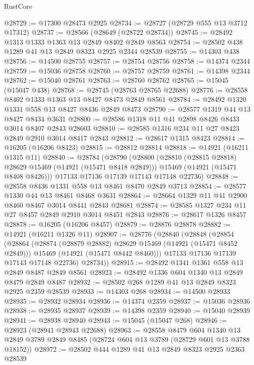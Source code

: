 \begin{lexlean}{RustCore}
\begin{coremodule}
@28729 := @17300 @28473 @2925
@28734 := @28727 (@28729 @555 @13 @3712 @17312)
@28737 := @28566 (@28649 (@28722 @28734))
@28745 := @28492 @1313 @1333 @1363 @13 @2849 @8402 @2849 @8563
@28754 := @28502 @438 @1289 @41 @13 @2849 @8323 @2925 @2344 @28539
@28755 := @14303 @438
@28756 := @14500 @28755
@28757 := @28754 @28756
@28758 := @14374 @2344
@28759 := @15036 @28758
@28760 := @28757 @28759
@28761 := @14398 @2344
@28762 := @15040 @28761
@28763 := @28760 @28762
@28765 := @15045 (@15047 @438)
@28768 := @28745 (@28763 @28765 @22688)
@28776 := @28558 @8402 @1333 @1363 @13 @8427 @8473 @2849 @8561
@28784 := @28492 @1320 @1331 @558 @13 @8427 @8436 @2849 @8473
@28790 := @28577 @1319 @44 @13 @8427 @8434 @3631
@28800 := @28586 @1318 @11 @41 @2898 @8426 @8433 @3014 @8407 @2843 @28603
@28810 := @28585 @1316 @234 @11 @27 @8423 @2849 @2910 @3014 @8417 @2843
@28812 := @28617 @1315 @8423
@28814 := @16205 (@16206 @8423)
@28815 := @28812 @28814
@28818 := @14921 (@16211 @1315 @11)
@28840 := @28784
    (@28790
      (@28800
        (@28810 (@28815 @28818) @28629 @15469 (@14921 (@15471 @8418 @2849)))
        @15469
        (@14921 (@15471 @8408 @8426)))
      @17133
      @17136
      @17139
      @17143
      @17148
      @22736)
@28848 := @28558 @8436 @1331 @558 @13 @8461 @8470 @2849 @3713
@28854 := @28577 @1330 @44 @13 @8461 @8468 @3631
@28864 := @28664 @1329 @11 @41 @2900 @8460 @8467 @3014 @8441 @2843 @28681
@28874 := @28585 @1327 @234 @11 @27 @8457 @2849 @2910 @3014 @8451 @2843
@28876 := @28617 @1326 @8457
@28878 := @16205 (@16206 @8457)
@28879 := @28876 @28878
@28882 := @14921 (@16211 @1326 @11)
@28907 := @28776
    (@28840
      (@28848
        (@28854
          (@28864
            (@28874 (@28879 @28882) @28629 @15469 (@14921 (@15471 @8452 @2849)))
            @15469
            (@14921 (@15471 @8442 @8460)))
          @17133
          @17136
          @17139
          @17143
          @17148
          @22736)
        @28734))
@28915 := @28492 @1341 @1361 @558 @13 @2849 @8487 @2849 @8561
@28923 := @28492 @1336 @604 @1340 @13 @2849 @8479 @2849 @8487
@28932 := @28502 @268 @1289 @41 @13 @2849 @8323 @2925 @2359 @28539
@28933 := @14303 @268
@28934 := @14500 @28933
@28935 := @28932 @28934
@28936 := @14374 @2359
@28937 := @15036 @28936
@28938 := @28935 @28937
@28939 := @14398 @2359
@28940 := @15040 @28939
@28941 := @28938 @28940
@28943 := @15045 (@15047 @268)
@28946 := @28923 (@28941 @28943 @22688)
@28963 := @28558
    @8479
    @604
    @1340
    @13
    @2849
    @3789
    @2849
    @8485
    (@28724 @604 @13 @3789 (@28729 @601 @13 @3788 @18152))
@28972 := @28502 @444 @1289 @41 @13 @2849 @8323 @2925 @2363 @28539

\end{coremodule}
\end{lexlean}
